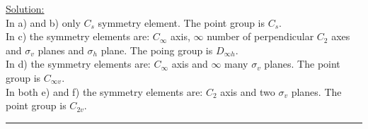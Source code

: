 \noindent
\underline{Solution:}\\

\noindent
In a) and b) only $C_s$ symmetry element. The point group is $C_s$.\\
In c) the symmetry elements are: $C_\infty$ axis, $\infty$ number of perpendicular $C_2$ axes and $\sigma_v$ planes and
$\sigma_h$ plane. The poing group is $D_{\infty h}$.\\
In d) the symmetry elements are: $C_\infty$ axis and $\infty$ many $\sigma_v$ planes. The point group is $C_{\infty v}$.\\
In both e) and f) the symmetry elements are: $C_2$ axis and two $\sigma_v$ planes. The point group is $C_{2v}$.\\

\hrule\vspace{0.5cm}



